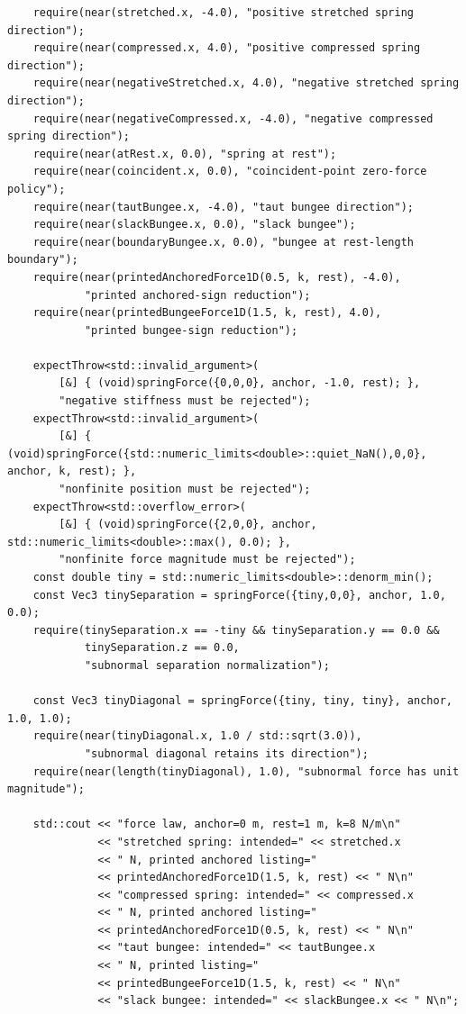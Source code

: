 \begin{verbatim}
    require(near(stretched.x, -4.0), "positive stretched spring direction");
    require(near(compressed.x, 4.0), "positive compressed spring direction");
    require(near(negativeStretched.x, 4.0), "negative stretched spring direction");
    require(near(negativeCompressed.x, -4.0), "negative compressed spring direction");
    require(near(atRest.x, 0.0), "spring at rest");
    require(near(coincident.x, 0.0), "coincident-point zero-force policy");
    require(near(tautBungee.x, -4.0), "taut bungee direction");
    require(near(slackBungee.x, 0.0), "slack bungee");
    require(near(boundaryBungee.x, 0.0), "bungee at rest-length boundary");
    require(near(printedAnchoredForce1D(0.5, k, rest), -4.0),
            "printed anchored-sign reduction");
    require(near(printedBungeeForce1D(1.5, k, rest), 4.0),
            "printed bungee-sign reduction");

    expectThrow<std::invalid_argument>(
        [&] { (void)springForce({0,0,0}, anchor, -1.0, rest); },
        "negative stiffness must be rejected");
    expectThrow<std::invalid_argument>(
        [&] { (void)springForce({std::numeric_limits<double>::quiet_NaN(),0,0}, anchor, k, rest); },
        "nonfinite position must be rejected");
    expectThrow<std::overflow_error>(
        [&] { (void)springForce({2,0,0}, anchor, std::numeric_limits<double>::max(), 0.0); },
        "nonfinite force magnitude must be rejected");
    const double tiny = std::numeric_limits<double>::denorm_min();
    const Vec3 tinySeparation = springForce({tiny,0,0}, anchor, 1.0, 0.0);
    require(tinySeparation.x == -tiny && tinySeparation.y == 0.0 &&
            tinySeparation.z == 0.0,
            "subnormal separation normalization");

    const Vec3 tinyDiagonal = springForce({tiny, tiny, tiny}, anchor, 1.0, 1.0);
    require(near(tinyDiagonal.x, 1.0 / std::sqrt(3.0)),
            "subnormal diagonal retains its direction");
    require(near(length(tinyDiagonal), 1.0), "subnormal force has unit magnitude");

    std::cout << "force law, anchor=0 m, rest=1 m, k=8 N/m\n"
              << "stretched spring: intended=" << stretched.x
              << " N, printed anchored listing="
              << printedAnchoredForce1D(1.5, k, rest) << " N\n"
              << "compressed spring: intended=" << compressed.x
              << " N, printed anchored listing="
              << printedAnchoredForce1D(0.5, k, rest) << " N\n"
              << "taut bungee: intended=" << tautBungee.x
              << " N, printed listing="
              << printedBungeeForce1D(1.5, k, rest) << " N\n"
              << "slack bungee: intended=" << slackBungee.x << " N\n";


\end{verbatim}
